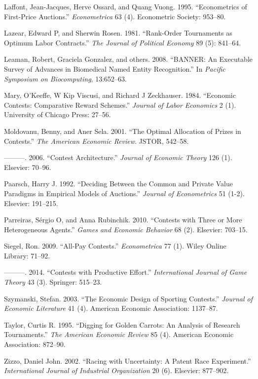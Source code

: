 \documentclass[10pt, titlepage]{article}
\begin{document}
\hypertarget{ref-laffont1995econometrics}{}
Laffont, Jean-Jacques, Herve Ossard, and Quang Vuong. 1995.
``Econometrics of First-Price Auctions.'' \emph{Econometrica} 63 (4).
Econometric Society: 953--80.

\hypertarget{ref-lazear1981rank}{}
Lazear, Edward P, and Sherwin Rosen. 1981. ``Rank-Order Tournaments as
Optimum Labor Contracts.'' \emph{The Journal of Political Economy} 89
(5): 841--64.

\hypertarget{ref-leaman2008banner}{}
Leaman, Robert, Graciela Gonzalez, and others. 2008. ``BANNER: An
Executable Survey of Advances in Biomedical Named Entity Recognition.''
In \emph{Pacific Symposium on Biocomputing}, 13:652--63.

\hypertarget{ref-mary1984economic}{}
Mary, O'Keeffe, W Kip Viscusi, and Richard J Zeckhauser. 1984.
``Economic Contests: Comparative Reward Schemes.'' \emph{Journal of
Labor Economics} 2 (1). University of Chicago Press: 27--56.

\hypertarget{ref-moldovanu2001optimal}{}
Moldovanu, Benny, and Aner Sela. 2001. ``The Optimal Allocation of
Prizes in Contests.'' \emph{The American Economic Review}. JSTOR,
542--58.

\hypertarget{ref-moldovanu2006contest}{}
---------. 2006. ``Contest Architecture.'' \emph{Journal of Economic
Theory} 126 (1). Elsevier: 70--96.

\hypertarget{ref-paarsch1992deciding}{}
Paarsch, Harry J. 1992. ``Deciding Between the Common and Private Value
Paradigms in Empirical Models of Auctions.'' \emph{Journal of
Econometrics} 51 (1-2). Elsevier: 191--215.

\hypertarget{ref-parreiras2010contests}{}
Parreiras, Sérgio O, and Anna Rubinchik. 2010. ``Contests with Three or
More Heterogeneous Agents.'' \emph{Games and Economic Behavior} 68 (2).
Elsevier: 703--15.

\hypertarget{ref-siegel2009all}{}
Siegel, Ron. 2009. ``All-Pay Contests.'' \emph{Econometrica} 77 (1).
Wiley Online Library: 71--92.

\hypertarget{ref-siegel2014contests}{}
---------. 2014. ``Contests with Productive Effort.''
\emph{International Journal of Game Theory} 43 (3). Springer: 515--23.

\hypertarget{ref-szymanski2003economic}{}
Szymanski, Stefan. 2003. ``The Economic Design of Sporting Contests.''
\emph{Journal of Economic Literature} 41 (4). American Economic
Association: 1137--87.

\hypertarget{ref-taylor1995digging}{}
Taylor, Curtis R. 1995. ``Digging for Golden Carrots: An Analysis of
Research Tournaments.'' \emph{The American Economic Review} 85 (4).
American Economic Association: 872--90.

\hypertarget{ref-zizzo2002racing}{}
Zizzo, Daniel John. 2002. ``Racing with Uncertainty: A Patent Race
Experiment.'' \emph{International Journal of Industrial Organization} 20
(6). Elsevier: 877--902.
\end{document}
